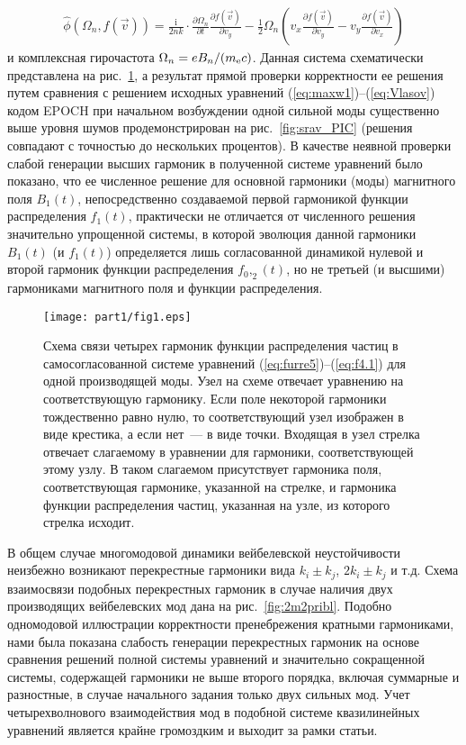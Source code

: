 \begin{align}
\label{eq:oper.1}
    \hat{\phi}(\Omega_{n},f(\vec{v}))  =  \frac{\mathrm{i}}{2nk}\cdot\frac{\partial \Omega_{n}}{\partial t}\frac{\partial f(\vec{v})}{\partial v_y} -\frac{1}{2}\Omega_{n} \left(v_x\frac{\partial f(\vec{v})}{\partial v_y}-v_y\frac{\partial f(\vec{v})}{\partial v_x}\right)
\end{align}
и комплексная гирочастота $\Omega_n={e B_n}/{(m_\mathrm{e} c)}$. Данная система схематически представлена на рис.~\ref{fig:1m2pribl_1}, а результат прямой проверки корректности ее решения путем сравнения с решением исходных уравнений (\ref{eq:maxw1})--(\ref{eq:Vlasov}) кодом EPOCH при начальном возбуждении одной сильной моды существенно выше уровня шумов продемонстрирован на рис.~\ref{fig:srav_PIC} (решения совпадают с точностью до нескольких процентов). В качестве неявной проверки слабой генерации высших гармоник в полученной системе уравнений было показано, что ее численное решение для основной гармоники (моды) магнитного поля $B_1(t)$, непосредственно создаваемой первой гармоникой функции распределения $f_1(t)$, практически не отличается от численного решения значительно упрощенной системы, в которой эволюция данной гармоники $B_1(t)$ (и $f_1(t)$) определяется лишь согласованной динамикой нулевой и второй гармоник функции распределения $f_0,_2(t)$, но не третьей (и высшими) гармониками магнитного поля и функции распределения.

\begin{figure}[t]
\texttt{[image: part1/fig1.eps]}
\centering
\caption{Схема связи четырех гармоник функции распределения частиц в самосогласованной системе уравнений (\ref{eq:furre5})--(\ref{eq:f4.1}) для одной производящей моды. Узел на схеме отвечает уравнению на соответствующую гармонику. Если поле некоторой гармоники тождественно равно нулю, то соответствующий узел изображен в виде крестика, а если нет~--- в виде точки. Входящая в узел стрелка отвечает слагаемому в уравнении для гармоники, соответствующей этому узлу. В таком слагаемом присутствует гармоника поля, соответствующая гармонике, указанной на стрелке, и гармоника функции распределения частиц, указанная на узле, из которого стрелка исходит.} 
\label{fig:1m2pribl_1}
\end{figure}

В общем случае многомодовой динамики вейбелевской неустойчивости неизбежно возникают перекрестные гармоники вида $k_i\pm k_j$, $2k_i\pm k_j$ и т.д. Схема взаимосвязи подобных перекрестных гармоник в случае наличия двух производящих вейбелевских мод дана на рис.~\ref{fig:2m2pribl}. Подобно одномодовой иллюстрации корректности пренебрежения кратными гармониками, нами была показана слабость генерации перекрестных гармоник на основе сравнения решений полной системы уравнений и значительно сокращенной системы, содержащей гармоники не выше второго порядка, включая суммарные и разностные, в случае начального задания только двух сильных мод. Учет четырехволнового взаимодействия мод в подобной системе квазилинейных уравнений является крайне громоздким и выходит за рамки статьи.


